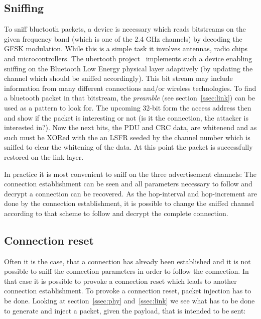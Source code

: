 \documentclass[conference]{IEEEtran}
\begin{document}
\subsection{Sniffing}

To sniff bluetooth packets, a device is necessary which reads bitstreams on the given frequency band (which is one of the 2.4 GHz channels) by decoding the GFSK modulation. While this is a simple task it involves antennas, radio chips and microcontrollers. The ubertooth project~\cite{ubertooth} implements such a device enabling sniffing on the Bluetooth Low Energy physical layer adaptively (by updating the channel which should be sniffed accordingly). This bit stream may include information from many different connections and/or wireless technologies. To find a bluetooth packet in that bitstream, the \emph{preamble} (see section~\ref{ssec:link}) can be used as a pattern to look for. The upcoming 32-bit form the access address then and show if the packet is interesting or not (is it the connection, the attacker is interested in?). Now the next bits, the PDU and CRC data, are whitenend and as such must be XORed with the an LSFR seeded by the channel number which is sniffed to clear the whitening of the data. At this point the packet is successfully restored on the link layer.




In practice it is most convenient to sniff on the three advertisement channels: 
The connection establishment can be seen and all parameters necessary to follow 
and decrypt a connection can be recovered. As the hop-interval and 
hop-increment are done by the connection establishment, it is possible to 
change the sniffed channel according to that scheme to follow and decrypt the 
complete connection.

\subsection{Connection reset} \label{ssec:conreset}

Often it is the case, that a connection has already been established and it is not possible to sniff the connection parameters in order to follow the connection. In that case it is possible to provoke a connection reset which leads to another connection establishment.
To provoke a connection reset, packet injection has to be done. Looking at section~\ref{ssec:phy} and~\ref{ssec:link} we see what has to be done to generate and inject a packet, given the payload, that is intended to be sent:
\end{document}
